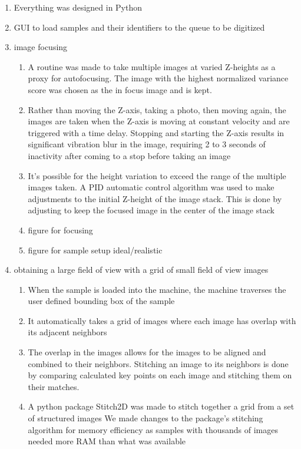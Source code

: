 \documentclass{article}
\begin{document}
\begin{outline}[enumerate]
\begin{enumerate}
			\begin{enumerate}
			\item Everything was designed in Python 
			\item GUI to load samples and their identifiers to the queue to be digitized
			\item image focusing
				\begin{enumerate}
				\item A routine was made to take multiple images at varied Z-heights as a proxy for autofocusing. The image with the highest normalized variance score was chosen as the in focus image and is kept. %
				\item Rather than moving the Z-axis, taking a photo, then moving again, the images are taken when the Z-axis is moving at constant velocity and are triggered with a time delay. Stopping and starting the Z-axis results in significant vibration blur in the image, requiring 2 to 3 seconds of inactivity after coming to a stop before taking an image
				\item It's possible for the height variation to exceed the range of the multiple images taken. A PID automatic control algorithm was used to make adjustments to the initial Z-height of the image stack. This is done by adjusting to keep the focused image in the center of the image stack %
				\item figure for focusing 
				\item figure for sample setup ideal/realistic
				\end{enumerate}
			\item obtaining a large field of view with a grid of small field of view images 
				\begin{enumerate}
				\item When the sample is loaded into the machine, the machine traverses the user defined bounding box of the sample
				\item It automatically takes a grid of images where each image has overlap with its adjacent neighbors
				\item The overlap in the images allows for the images to be aligned and combined to their neighbors. Stitching an image to its neighbors is done by comparing calculated key points on each image and stitching them on their matches.
				\item A python package Stitch2D was made to stitch together a grid from a set of structured images %
					\subitem We made changes to the package's stitching algorithm for memory efficiency as samples with thousands of images needed more RAM than what was available

\end{enumerate}
\end{enumerate}
\end{enumerate}
\end{outline}
\end{document}
